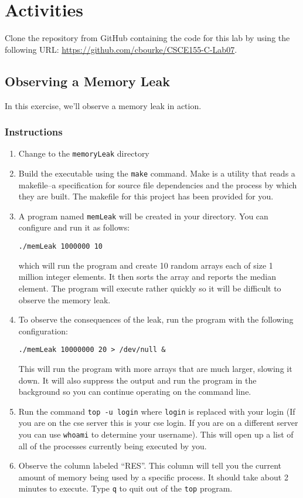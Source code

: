 \documentclass[12pt]{scrartcl}
\begin{document}
\section{Activities}

Clone the repository from GitHub containing the code for this lab by using
the following URL: \url{https://github.com/cbourke/CSCE155-C-Lab07}.

\subsection{Observing a Memory Leak}

In this exercise, we'll observe a memory leak in action.

\subsubsection*{Instructions}
\begin{enumerate}
  \item Change to the \texttt{memoryLeak} directory
  \item Build the executable using the \texttt{make} command.
  	Make is a utility that reads a makefile--a specification for source file
	dependencies and the process by which they are built.  The makefile
	for this project has been provided for you.
  \item A program named \texttt{memLeak} will be created in your
	directory.  You can configure and run it as follows:

	\texttt{./memLeak 1000000 10}

	which will run the program and create 10 random arrays each of size
	1 million integer elements.  It then sorts the array and reports
	the median element.  The program will execute rather quickly so it
	will be difficult to observe the memory leak.

  \item To observe the consequences of the leak, run the program with
    the following configuration:

	\texttt{./memLeak 10000000 20 > /dev/null &}

	This will run the program with more arrays that are much larger,
	slowing it down.  It will also suppress the output and run the
	program in the background so you can continue operating on the
	command line.

  \item Run the command \texttt{top -u login} where \texttt{login}
	is replaced with your login (If you are on the cse server this is your
	cse login.  If you are on a different server you can use
	\texttt{whoami} to determine your username).  This
	will open up a list of all of the
	processes currently being executed by you.

  \item Observe the column labeled ``RES''.  This column will tell you
    the current amount of memory being used by a specific process.
    It should take about 2 minutes to execute.  Type \texttt{q}
    to quit out of the \texttt{top} program.
\end{enumerate}
\end{document}
